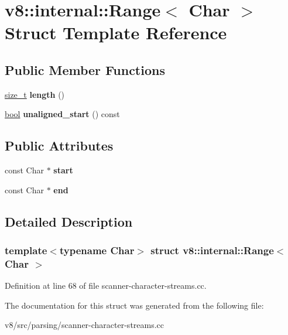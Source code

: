 \hypertarget{structv8_1_1internal_1_1Range}{}\section{v8\+:\+:internal\+:\+:Range$<$ Char $>$ Struct Template Reference}
\label{structv8_1_1internal_1_1Range}
\subsection*{Public Member Functions}
\begin{DoxyCompactItemize}
\item 
\mbox{\label{structv8_1_1internal_1_1Range_a4da3f6cf5fc280d1a41de936973fa6c6}} 
\mbox{\hyperlink{classsize__t}{size\+\_\+t}} {\bfseries length} ()
\item 
\mbox{\label{structv8_1_1internal_1_1Range_aae26daf46897e2b07b3cc27c336d1a43}} 
\mbox{\hyperlink{classbool}{bool}} {\bfseries unaligned\+\_\+start} () const
\end{DoxyCompactItemize}
\subsection*{Public Attributes}
\begin{DoxyCompactItemize}
\item 
\mbox{\label{structv8_1_1internal_1_1Range_aca7a4c46616f73ccbe2584dad3b61acb}} 
const Char $\ast$ {\bfseries start}
\item 
\mbox{\label{structv8_1_1internal_1_1Range_a86beecddb8937fb789291123a8da247c}} 
const Char $\ast$ {\bfseries end}
\end{DoxyCompactItemize}


\subsection{Detailed Description}
\subsubsection*{template$<$typename Char$>$\newline
struct v8\+::internal\+::\+Range$<$ Char $>$}



Definition at line 68 of file scanner-\/character-\/streams.\+cc.



The documentation for this struct was generated from the following file\+:\begin{DoxyCompactItemize}
\item 
v8/src/parsing/scanner-\/character-\/streams.\+cc\end{DoxyCompactItemize}

